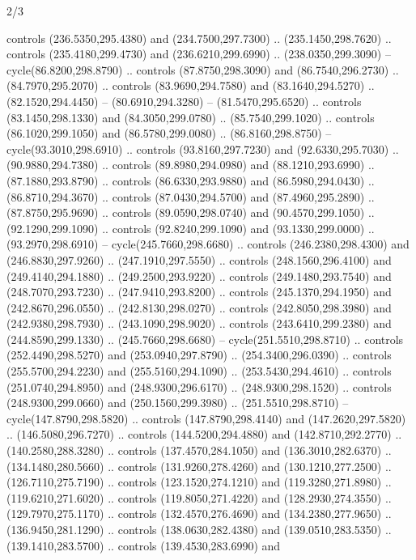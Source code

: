 \begin{flagdescription}{2/3}
\begin{scope}[xshift=0.5\flaglength,yshift=0.5\flagwidth,scale=\stretchfactor]
\begin{scope}[scale=0.001645\flagwidth,yshift=65mm,xshift=-63mm]
\begin{scope}[y=0.80pt, x=0.80pt, yscale=-1,]
\begin{scope}[cm={{1.33333,0.0,0.0,1.33333,(0.0,1e-05)}}]
  controls (236.5350,295.4380) and (234.7500,297.7300) .. (235.1450,298.7620) ..
  controls (235.4180,299.4730) and (236.6210,299.6990) .. (238.0350,299.3090) --
  cycle(86.8200,298.8790) .. controls (87.8750,298.3090) and (86.7540,296.2730)
  .. (84.7970,295.2070) .. controls (83.9690,294.7580) and (83.1640,294.5270) ..
  (82.1520,294.4450) -- (80.6910,294.3280) -- (81.5470,295.6520) .. controls
  (83.1450,298.1330) and (84.3050,299.0780) .. (85.7540,299.1020) .. controls
  (86.1020,299.1050) and (86.5780,299.0080) .. (86.8160,298.8750) --
  cycle(93.3010,298.6910) .. controls (93.8160,297.7230) and (92.6330,295.7030)
  .. (90.9880,294.7380) .. controls (89.8980,294.0980) and (88.1210,293.6990) ..
  (87.1880,293.8790) .. controls (86.6330,293.9880) and (86.5980,294.0430) ..
  (86.8710,294.3670) .. controls (87.0430,294.5700) and (87.4960,295.2890) ..
  (87.8750,295.9690) .. controls (89.0590,298.0740) and (90.4570,299.1050) ..
  (92.1290,299.1090) .. controls (92.8240,299.1090) and (93.1330,299.0000) ..
  (93.2970,298.6910) -- cycle(245.7660,298.6680) .. controls (246.2380,298.4300)
  and (246.8830,297.9260) .. (247.1910,297.5550) .. controls (248.1560,296.4100)
  and (249.4140,294.1880) .. (249.2500,293.9220) .. controls (249.1480,293.7540)
  and (248.7070,293.7230) .. (247.9410,293.8200) .. controls (245.1370,294.1950)
  and (242.8670,296.0550) .. (242.8130,298.0270) .. controls (242.8050,298.3980)
  and (242.9380,298.7930) .. (243.1090,298.9020) .. controls (243.6410,299.2380)
  and (244.8590,299.1330) .. (245.7660,298.6680) -- cycle(251.5510,298.8710) ..
  controls (252.4490,298.5270) and (253.0940,297.8790) .. (254.3400,296.0390) ..
  controls (255.5700,294.2230) and (255.5160,294.1090) .. (253.5430,294.4610) ..
  controls (251.0740,294.8950) and (248.9300,296.6170) .. (248.9300,298.1520) ..
  controls (248.9300,299.0660) and (250.1560,299.3980) .. (251.5510,298.8710) --
  cycle(147.8790,298.5820) .. controls (147.8790,298.4140) and
  (147.2620,297.5820) .. (146.5080,296.7270) .. controls (144.5200,294.4880) and
  (142.8710,292.2770) .. (140.2580,288.3280) .. controls (137.4570,284.1050) and
  (136.3010,282.6370) .. (134.1480,280.5660) .. controls (131.9260,278.4260) and
  (130.1210,277.2500) .. (126.7110,275.7190) .. controls (123.1520,274.1210) and
  (119.3280,271.8980) .. (119.6210,271.6020) .. controls (119.8050,271.4220) and
  (128.2930,274.3550) .. (129.7970,275.1170) .. controls (132.4570,276.4690) and
  (134.2380,277.9650) .. (136.9450,281.1290) .. controls (138.0630,282.4380) and
  (139.0510,283.5350) .. (139.1410,283.5700) .. controls (139.4530,283.6990) and

\end{scope}
\end{scope}
\end{scope}
\end{scope}
\end{flagdescription}
